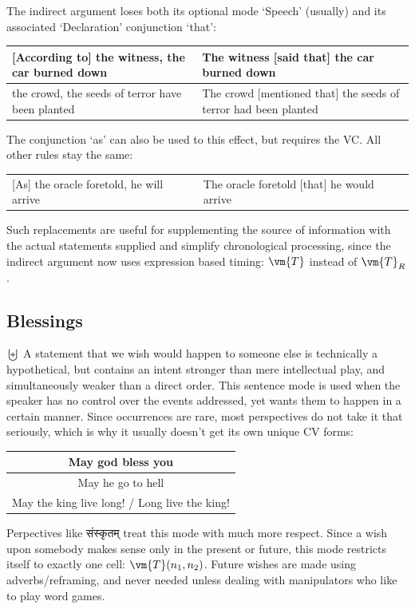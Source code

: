 The indirect argument loses both its optional mode `Speech' (usually) and its associated `Declaration' conjunction `that':
\begin{example}
    \begin{tabular}{m{7cm}|m{6.5cm}}
        [According to] the witness, the car burned down & The witness [said that] the car burned down\\\hline
        [According to] the crowd, the seeds of terror have been planted & The crowd [mentioned that] the seeds of terror had been planted
    \end{tabular}
\end{example}
The conjunction `as' can also be used to this effect, but requires the VC. All other rules stay the same:
\begin{example}
    \begin{tabular}{m{7cm}|m{7cm}}
        [As] the oracle foretold, he will arrive & The oracle foretold [that] he would arrive
    \end{tabular}
\end{example}
Such replacements are useful for supplementing the source of information with the actual statements supplied and simplify chronological processing, since the indirect argument now uses expression based timing: $\vm{T}$ instead of  $\vm{T}_R$.
\subsection{Blessings}
$\biguplus$ A statement that we wish would happen to someone else is  technically a hypothetical, but contains an  intent stronger than  mere intellectual play, and simultaneously weaker than a direct order. This sentence mode is used when the speaker has no control over the events addressed, yet wants them to happen in a certain manner. Since occurrences are rare,  most perspectives do not take it that seriously, which is why it usually doesn't get its own unique CV forms:
\begin{example}
    \begin{tabular}{c}
        May god bless you\\\hline May he go to hell\\\hline May the king live long! / Long live the king!
    \end{tabular}
\end{example}
Perpectives like \textsanskrit{संस्कृतम्} treat this mode with much more respect. Since a wish upon somebody makes sense only in the present or future, this mode restricts itself to exactly one cell: $\vm{T}(n_1,n_2)$. Future wishes are made using adverbs/reframing, and never needed unless dealing with manipulators who like to play word games.
